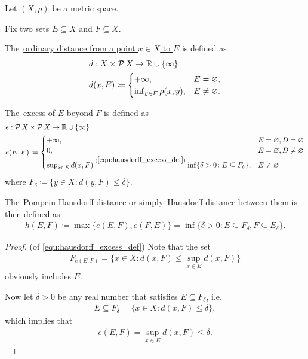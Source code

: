 Let $(X, \rho)$ be a metric space.

\begin{definition}\label{def:hausdorff_distance}\cite[144]{Dontchev2014}
  Fix two sets $E \subseteq X$ and $F \subseteq X$.

  The~\uline{ordinary distance from a point $x \in X$ to $E$} is defined as
  \begin{align*}
    &d: X \times \operatorname{\mathcal P} X \to \mathbb R \cup \{ \infty \}
    \\
    &d(x, E) \coloneqq \begin{cases}
      +\infty, &E = \varnothing, \\
      \inf_{y \in F} \rho(x, y), &E \neq \varnothing.
    \end{cases}
  \end{align*}

  The~\uline{excess of $E$ beyond $F$} is defined as
  \begin{align}\label{equ:hausdorff_excess_def}
    &e: \Power X \times \Power X \to \Real \cup \{ \infty \} \\ \nonumber
    &e(E, F) \coloneqq \begin{cases}
      +\infty, &E = \varnothing, D = \varnothing \\
      0, &E = \varnothing, D \neq \varnothing \\
      \sup_{x \in E} d(x, F) \stackrel{(\ref{equ:hausdorff_excess_def})}{=} \inf \{\delta > 0 \colon E \subseteq F_\delta \}, &E \neq \varnothing \nonumber\refstepcounter{equation}
    \end{cases}
  \end{align}
  where $F_\delta \coloneqq \{ y \in X \colon d(y, F) \leq \delta \}$.

  The~\uline{Pompeiu-Hausdorff distance} or simply~\uline{Hausdorff} distance between them is then defined as
  \begin{align*}
    h(E, F) \coloneqq \max\{ e(E, F), e(F, E) \} = \inf \{\delta > 0 \colon E \subseteq F_\delta, F \subseteq E_\delta \}.
  \end{align*}
\end{definition}
\begin{proof}(of \ref{equ:hausdorff_excess_def})
  Note that the set
  \begin{align*}
    F_{e(E, F)} = \{ x \in X \colon d(x, F) \leq \sup_{x \in E} d(x, F) \}
  \end{align*}
  obviously includes $E$.

  Now let $\delta > 0$ be any real number that satisfies $E \subseteq F_\delta$, i.e.
  \begin{align*}
    E \subseteq F_\delta = \{ x \in X \colon d(x, F) \leq \delta \},
  \end{align*}
  which implies that
  \begin{align*}
    e(E, F) = \sup_{x \in E} d(x, F) \leq \delta.
  \end{align*}
\end{proof}

